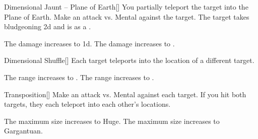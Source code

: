\lowercase{\hypertarget{spell:Dimensional Jaunt -- Plane of Earth}{}}\label{spell:Dimensional Jaunt -- Plane of Earth}
\begin{freeability}[Rank 3]{\hypertarget{spell:Dimensional Jaunt -- Plane of Earth}{Dimensional Jaunt -- Plane of Earth}}[]
You partially teleport the target into the Plane of Earth.
Make an attack vs. Mental against the target.
\hit The target takes bludgeoning  \minus2d and is  as a .

\rankline
{} The damage increases to  \minus1d.
 The damage increases to .
\end{freeability}
\vspace{0.25em}



\lowercase{\hypertarget{spell:Dimensional Shuffle}{}}\label{spell:Dimensional Shuffle}
\begin{freeability}[Rank 3]{\hypertarget{spell:Dimensional Shuffle}{Dimensional Shuffle}}[]
Each target teleports into the location of a different target.

\rankline
{} The range increases to \rnglong.
 The range increases to \rngext.
\end{freeability}
\vspace{0.25em}



\lowercase{\hypertarget{spell:Transposition}{}}\label{spell:Transposition}
\begin{freeability}[Rank 3]{\hypertarget{spell:Transposition}{Transposition}}[]
Make an attack vs. Mental against each target.
If you hit both targets, they each teleport into each other's locations.

\rankline
{} The maximum size increases to Huge.
 The maximum size increases to Gargantuan.
\end{freeability}
\vspace{0.25em}



